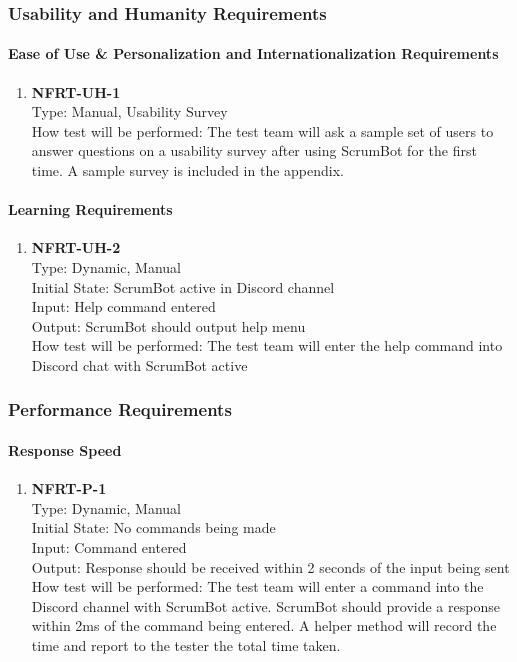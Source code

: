 \documentclass[12pt, titlepage]{article}
\begin{document}
\subsubsection{Usability and Humanity Requirements}
\paragraph{Ease of Use \& Personalization and Internationalization Requirements}
\begin{enumerate}
    \item{\textbf{NFRT-UH-1}}\\
    Type: Manual, Usability Survey\\
    How test will be performed: The test team will ask a sample set of users to answer questions on a usability survey after using ScrumBot for the first time. A sample survey is included in the appendix.
\end{enumerate}

\paragraph{Learning Requirements}
\begin{enumerate}
    \item{\textbf{NFRT-UH-2}}\\
    Type: Dynamic, Manual\\
    Initial State: ScrumBot active in Discord channel\\
    Input: Help command entered\\
    Output: ScrumBot should output help menu\\
    How test will be performed: The test team will enter the help command into Discord chat with ScrumBot active
\end{enumerate}

\subsubsection{Performance Requirements}
\paragraph{Response Speed}
\begin{enumerate}
\item{\textbf{NFRT-P-1}}\\
    Type: Dynamic, Manual\\
    Initial State: No commands being made\\
    Input: Command entered\\
    Output: Response should be received within 2 seconds of the input being sent\\
    How test will be performed: The test team will enter a command into the Discord channel with ScrumBot active. ScrumBot should provide a response within 2ms of the command being entered. A helper method will record the time and report to the tester the total time taken.
\end{enumerate}
\end{document}
